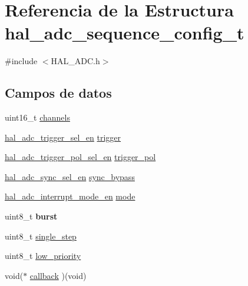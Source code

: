 \hypertarget{structhal__adc__sequence__config__t}{}\section{Referencia de la Estructura hal\+\_\+adc\+\_\+sequence\+\_\+config\+\_\+t}
\label{structhal__adc__sequence__config__t}


{\ttfamily \#include $<$H\+A\+L\+\_\+\+A\+D\+C.\+h$>$}

\subsection*{Campos de datos}
\begin{DoxyCompactItemize}
\item 
uint16\+\_\+t \hyperlink{structhal__adc__sequence__config__t_acebe3f0fdc69a72787ddd6b19870641b}{channels}
\item 
\hyperlink{group__ADC_ga67fe859b54301579f1b1daef874514ca}{hal\+\_\+adc\+\_\+trigger\+\_\+sel\+\_\+en} \hyperlink{structhal__adc__sequence__config__t_a6bcb45974cab7522fa8fddd79fa7f1e1}{trigger}
\item 
\hyperlink{group__ADC_ga4c5aa9e0991c432640845d2aedb971b2}{hal\+\_\+adc\+\_\+trigger\+\_\+pol\+\_\+sel\+\_\+en} \hyperlink{structhal__adc__sequence__config__t_a0e3bc5f0a78cf105554a67af8f34d383}{trigger\+\_\+pol}
\item 
\hyperlink{group__ADC_ga8aa0efd767a9edc5a80b80c4061e0904}{hal\+\_\+adc\+\_\+sync\+\_\+sel\+\_\+en} \hyperlink{structhal__adc__sequence__config__t_a97da414f66a2d3643c7a9cf9ff6f64d2}{sync\+\_\+bypass}
\item 
\hyperlink{group__ADC_gaf4981172881d597ede49249ba04fcafe}{hal\+\_\+adc\+\_\+interrupt\+\_\+mode\+\_\+en} \hyperlink{structhal__adc__sequence__config__t_adea8d61d74a67ea1d2da046c57f30590}{mode}
\item 
\mbox{\label{structhal__adc__sequence__config__t_afe2931739ce28ec41475885a46fdc910}} 
uint8\+\_\+t {\bfseries burst}
\item 
uint8\+\_\+t \hyperlink{structhal__adc__sequence__config__t_ac70813667637a3ee24db9f7f2606d87b}{single\+\_\+step}
\item 
uint8\+\_\+t \hyperlink{structhal__adc__sequence__config__t_a1dc8fcb4920ed109389a6391e8c1c9ef}{low\+\_\+priority}
\item 
void($\ast$ \hyperlink{structhal__adc__sequence__config__t_a42710517a48ebba1b95e66e9f005cf7d}{callback} )(void)
\end{DoxyCompactItemize}


